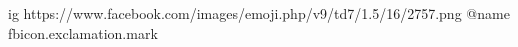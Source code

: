  
 
 
 
 

\ifcmt




	ig https://www.facebook.com/images/emoji.php/v9/td7/1.5/16/2757.png
	@name fbicon.exclamation.mark

\fi
